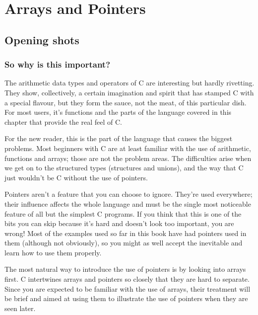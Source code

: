 
\chapter{Arrays and Pointers}


        \section{Opening shots}
        

  

  \subsection{So why is this important?}
   

   The arithmetic data types and operators of C are interesting but
    hardly rivetting. They show, collectively, a certain imagination and
    spirit that has stamped C with a special flavour, but they form the
    sauce, not the meat, of this particular dish. For most users, it's
    functions and the parts of the language covered in this chapter that
    provide the real feel of C.


   For the new reader, this is the part of the language that causes the
    biggest problems. Most beginners with C are at least familiar with the
    use of arithmetic, functions and arrays; those are not the problem
    areas.  The difficulties arise when we get on to the structured types
    (structures and unions), and the way that C just wouldn't be C without
    the use of pointers.


   Pointers aren't a feature that you can choose to ignore. They're used
    everywhere; their influence affects the whole language and must be the
    single most noticeable feature of all but the simplest C programs. If
    you think that this is one of the bits you can skip because it's hard
    and doesn't look too important, you are wrong! Most of the examples used
    so far in this book have had pointers used in them (although not
    obviously), so you might as well accept the inevitable and learn how to
    use them properly.


   The most natural way to introduce the use of pointers is by looking
    into arrays first. C intertwines arrays and pointers so closely that
    they are hard to separate. Since you are expected to be familiar with
    the use of arrays, their treatment will be brief and aimed at using them
    to illustrate the use of pointers when they are seen later.


